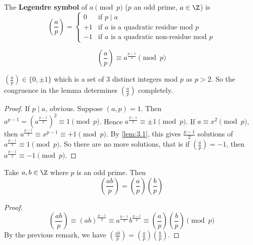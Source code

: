 \documentclass{article}
\newcommand{\legendre}[2]{\genfrac{(}{)}{}{}{#1}{#2}}
\begin{document}
\begin{defi}
    The \textbf{Legendre symbol} of $a \pmod{p}$ ($p$ an odd prime, $a \in \Z$) is
    \begin{equation*}
        \legendre{a}{p} =
        \begin{cases}
            0 & \text{if } p \mid a \\
            +1 & \text{if $a$ is a quadratic residue mod $p$} \\
            -1 & \text{if $a$ is a quadratic non-residue mod $p$}
        \end{cases}
    \end{equation*}
\end{defi}

\begin{lemma}
    \begin{equation*}
        \legendre{a}{p} \equiv a^{\frac{p-1}{2}} \pmod{p}
    \end{equation*}
\end{lemma}

\begin{remark}
    $\legendre{a}{p} \in \{0, \pm 1\}$ which is a set of $3$ distinct integers mod $p$ as $p > 2$. So the congruence in the lemma determines $\legendre{a}{p}$ completely.
\end{remark}

\begin{proof}
    If $p \mid a$, obvious. Suppose $(a, p) = 1$. Then $a^{p-1} = \left(a^{\frac{p-1}{2}}\right)^2 \equiv 1 \pmod{p}$.
    Hence $a^{\frac{p-1}{2}} \equiv \pm 1 \pmod{p}$. If $a \equiv x^2 \pmod{p}$, then $a^{\frac{p-1}{2}} \equiv x^{p-1} \equiv +1 \pmod{p}$.
    By \cref{lem:3.1}, this gives $\frac{p-1}{2}$ solutions of $a^{\frac{p-1}{2}} \equiv 1 \pmod{p}$.
    So there are no more solutions, that is if $\legendre{a}{p} = -1$, then $a^{\frac{p-1}{2}} \equiv -1 \pmod{p}$.
\end{proof}

\begin{ncor}\label{cor:3.2}
    Take $a, b \in \Z$ where $p$ is an odd prime. Then
    \begin{equation*}
        \legendre{ab}{p} = \legendre{a}{p} \legendre{b}{p}
    \end{equation*}
\end{ncor}

\begin{proof}
    \begin{equation*}
        \legendre{ab}{p} \equiv (ab)^{\frac{p-1}{2}} \equiv a^{\frac{p-1}{2}} b^{\frac{p-1}{2}} \equiv \legendre{a}{p} \legendre{b}{p} \pmod{p}
    \end{equation*}
    By the previous remark, we have $\legendre{ab}{p} = \legendre{a}{p} \legendre{b}{p}$.
\end{proof}
\end{document}
